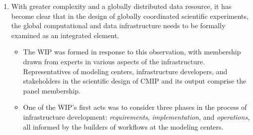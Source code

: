 \documentclass[gmd,manuscript]{copernicus}
\begin{document}
\begin{enumerate}
\item With greater complexity and a globally distributed data
  resource, it has become clear that in the design of globally
  coordinated scientific experiments, the global computational and
  data infrastructure needs to be formally examined as an integrated
  element.

  \begin{itemize}
  \item The WIP was formed in response to this observation, with
    membership drawn from experts in various aspects of the
    infrastructure. Representatives of modeling centers,
    infrastructure developers, and stakeholders in the scientific
    design of CMIP and its output comprise the panel membership.
  \item One of the WIP's first acts was to consider three phases in
    the process of infrastructure development: \emph{requirements},
    \emph{implementation}, and \emph{operations}, all informed by the
    builders of workflows at the modeling centers.
    

\end{itemize}
\end{enumerate}
\end{document}
